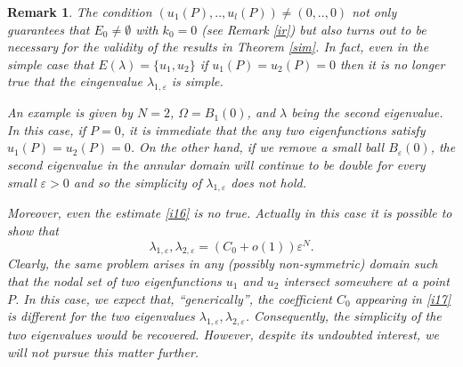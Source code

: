 \documentclass[11pt,reqno]{article}
\newtheorem{rem}[teo]{Remark}
\numberwithin{equation}{section}
\newcommand\e\varepsilon
\newcommand\la\lambda
\begin{document}
\begin{rem}\label{ii3}
The condition $(u_1(P),..,u_l(P))\neq(0,..,0)$ not only guarantees that $E_0\ne\emptyset$ with $k_0=0$ (see Remark \ref{ir}) but also turns out to be necessary for the validity of the results in Theorem \ref{sim}. 
In fact, even in the simple case that $E(\la)=\{u_1,u_2\}$
if $u_1(P)=u_2(P)=0$  then it is no longer true that the eingenvalue $\la_{1,\e}$ is simple.

An example is given by $N=2$, $\Omega=B_1(0)$, and $\la$ being the second eigenvalue. In this case, if $P=0$, it is immediate that the any two eigenfunctions satisfy $u_1(P)=u_2(P)=0$. On the other hand, if we remove a small ball $B_\e(0)$, the second eigenvalue in the annular domain will continue to be double for every small $\e>0$ and so the simplicity of $\la_{1,\e}$ does not hold. 

Moreover, even the estimate \eqref{i16} is no true. Actually in this case it is possible to show that
\begin{equation}\label{i17}
        \la_{1,\e},\la_{2,\e}=\left(C_0+o(1)\right)\e^N.
			\end{equation}
Clearly, the same problem arises in any (possibly non-symmetric) domain such that the nodal set of two eigenfunctions $u_1$ and $u_2$ intersect somewhere at a point $P$. In this case, we expect that, ``generically'',  the coefficient $C_0$ appearing in \eqref{i17} is different for the two eigenvalues $\la_{1,\e},\la_{2,\e}$. Consequently, the simplicity of the two eigenvalues would be recovered. However, despite its undoubted interest, we will not pursue this matter further.
\end{rem}
\end{document}
